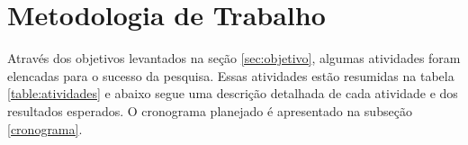 \documentclass[a4paper,titlepage,12pt]{article}
\begin{document}

\newpage
\section{Metodologia de Trabalho}
\label{sec:metodologia}

Através dos objetivos levantados na seção \ref{sec:objetivo}, algumas atividades foram elencadas para o sucesso da pesquisa. Essas atividades estão resumidas na tabela \ref{table:atividades} e abaixo segue uma descrição detalhada de cada atividade e dos resultados esperados. O cronograma planejado é apresentado na subseção \ref{cronograma}.
\end{document}

